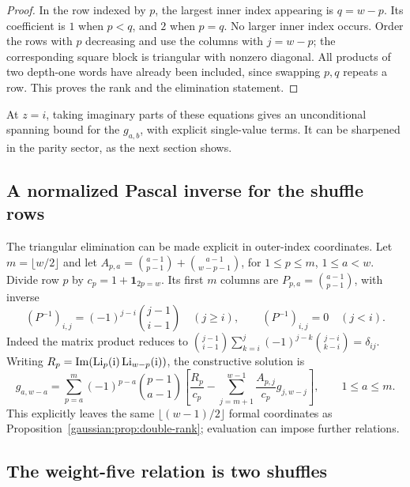 \begin{proof}
In the row indexed by \(p\), the largest inner index appearing is
\(q=w-p\). Its coefficient is \(1\) when \(p<q\), and \(2\)
when \(p=q\). No larger inner index occurs.
Order the rows with \(p\) decreasing and use the columns with
\(j=w-p\); the corresponding square block is triangular with nonzero
diagonal. All products of two depth-one words have already been included,
since swapping \(p,q\) repeats a row. This proves the rank and the
elimination statement.
\end{proof}

At \(z=i\), taking imaginary parts of these equations gives an
unconditional spanning bound for the \(g_{a,b}\), with explicit
single-value terms. It can be sharpened in the parity sector, as the
next section shows.

\subsection{A normalized Pascal inverse for the shuffle rows}
The triangular elimination can be made explicit in outer-index coordinates.
Let $m=\lfloor w/2\rfloor$ and let $A_{p,a}=\binom{a-1}{p-1}+
\binom{a-1}{w-p-1}$, for $1\le p\le m$, $1\le a<w$.
Divide row $p$ by $c_p=1+\mathbf1_{2p=w}$. Its first $m$ columns are
$P_{p,a}=\binom{a-1}{p-1}$, with inverse
\[
 (P^{-1})_{i,j}=(-1)^{j-i}\binom{j-1}{i-1}\quad(j\ge i),
 \qquad (P^{-1})_{i,j}=0\quad(j<i).
\]
Indeed the matrix product reduces to
$\binom{j-1}{i-1}\sum_{k=i}^j(-1)^{j-k}\binom{j-i}{k-i}=\delta_{ij}$.
Writing $R_p=\operatorname{Im}(\operatorname{Li}_p(\mathrm{i})\operatorname{Li}_{w-p}(\mathrm{i}))$, the constructive solution is
\begin{equation}\label{signed:eq:shuffle-solve}
 g_{a,w-a}=\sum_{p=a}^m(-1)^{p-a}\binom{p-1}{a-1}
 \left[\frac{R_p}{c_p}-\sum_{j=m+1}^{w-1}\frac{A_{p,j}}{c_p}g_{j,w-j}\right],
 \qquad 1\le a\le m.
\end{equation}
This explicitly leaves the same $\lfloor(w-1)/2\rfloor$ formal coordinates
as Proposition~\ref{gaussian:prop:double-rank}; evaluation can impose further
relations.

\subsection{The weight-five relation is two shuffles}

